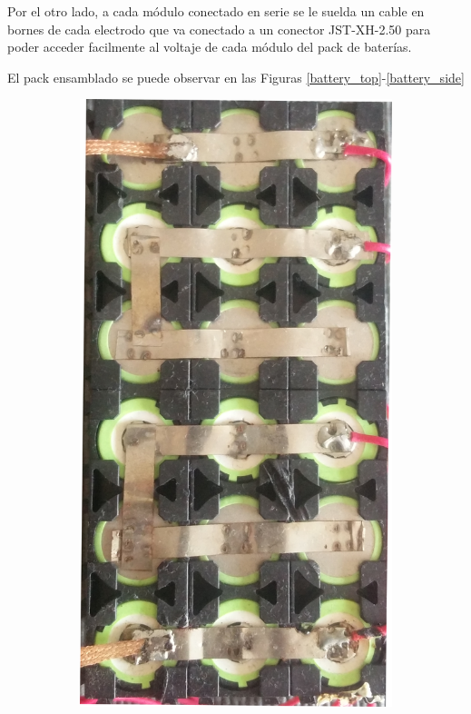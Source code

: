 \documentclass[10pt, a4paper]{report}
\begin{document}
Por el otro lado, a cada m\'odulo conectado en serie se le suelda un cable en
bornes de cada electrodo que va conectado a un conector JST-XH-2.50 para poder
acceder facilmente al voltaje de cada m\'odulo del pack de bater\'ias.

El pack ensamblado se puede observar en las Figuras \ref{battery_top}-\ref{battery_side}

\begin{figure}[h!]
    \begin{subfigure}[t]{.3\textwidth}
	\begin{center}
        \includegraphics[width=.9\textwidth]{battery_top.png}

\end{center}
\end{subfigure}
\end{figure}
\end{document}
